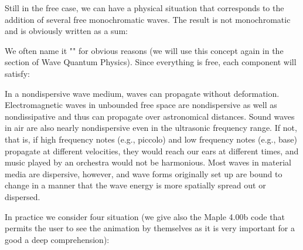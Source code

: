 	Still in the free case, we can have a physical situation that corresponds to the addition of several free monochromatic waves. The result is not monochromatic and is obviously written as a sum:	
	
	We often name it "" for obvious reasons (we will use this concept again in the section of Wave Quantum Physics). Since everything is free, each component will satisfy:
	
	In a nondispersive wave medium, waves can propagate without deformation. Electromagnetic waves in unbounded free space are nondispersive as well as nondissipative and thus can propagate over astronomical distances. Sound waves in air are also nearly nondispersive even in the ultrasonic frequency range. If not, that is, if high frequency notes (e.g., piccolo) and low frequency notes (e.g., base) propagate at different velocities, they would reach our ears at different times, and music played by an orchestra would not be harmonious. Most waves in material media are dispersive, however, and wave forms originally set up are bound to change in a manner that the wave energy is more spatially spread out or dispersed.
	
	In practice we consider four situation (we give also the Maple 4.00b code that permits the user to see the animation by themselves as it is very important for a good a deep comprehension):


